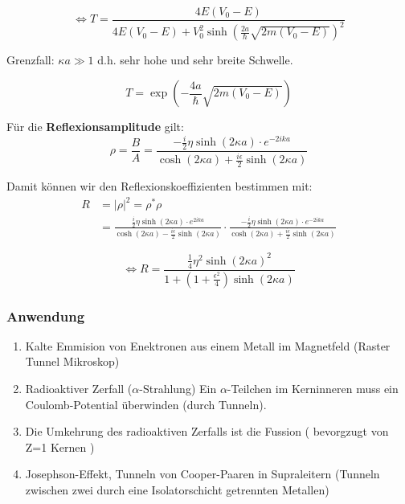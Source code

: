   \begin{equation}
    \label{eq:32}
    \Leftrightarrow T = \frac{4 E (V_0-E)}{4 E (V_0-E)+V_0^2 \sinh\left(\frac{2a}\hbar
        \sqrt{2 m (V_0 - E)} \right)^2}
  \end{equation}

Grenzfall: \( \kappa a \gg 1 \) d.h. sehr hohe und sehr breite Schwelle.

\[ T = \exp \left(-\frac {4a}\hbar \sqrt{2m(V_0-E)} \right) \]

Für die \textbf{Reflexionsamplitude} gilt:
\[ \rho = \frac B A = \frac{-\frac i 2 \eta \sinh(2 \kappa a)
          \cdot e^{-2 i k a}}
        {\cosh(2 \kappa a)+\frac{i\epsilon}{2} \sinh(2 \kappa a)} \]

Damit können wir den Reflexionskoeffizienten bestimmen mit:
\begin{align*}
  R &= |\rho|^2 = \rho^*\rho \\
    &= \frac{\frac i 2 \eta \sinh(2 \kappa a)
          \cdot e^{2 i k a}}
        {\cosh(2 \kappa a)-\frac{i\epsilon}{2} \sinh(2 \kappa a)} \cdot
       \frac{-\frac i 2 \eta \sinh(2 \kappa a)
          \cdot e^{-2 i k a}}
        {\cosh(2 \kappa a)+\frac{i\epsilon}{2} \sinh(2 \kappa a)}
\end{align*}

  \begin{equation}
    \label{eq:32Rkoef}
    \Leftrightarrow R = \frac{\frac 1 4 \eta^2 \sinh(2 \kappa a)^2}
    {1+\left(1+\frac {\epsilon^2} 4 \right) \sinh(2 \kappa a)}
  \end{equation}


\subsubsection{Anwendung}
\begin{enumerate}
\item Kalte Emmision von Enektronen aus einem Metall im Magnetfeld (Raster Tunnel Mikroskop)
\item Radioaktiver Zerfall (\(\alpha\)-Strahlung) Ein \(\alpha\)-Teilchen im Kerninneren muss ein Coulomb-Potential überwinden (durch Tunneln).
\item Die Umkehrung des radioaktiven Zerfalls ist die Fussion ( bevorgzugt von Z=1 Kernen )
\item Josephson-Effekt, Tunneln von Cooper-Paaren in Supraleitern (Tunneln zwischen zwei durch eine Isolatorschicht getrennten Metallen)
\end{enumerate}


